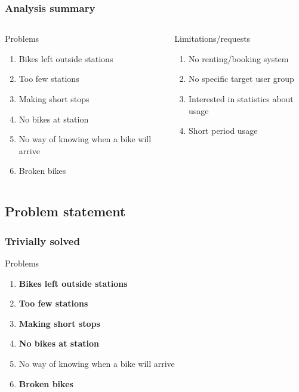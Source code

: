 \begin{frame}
\frametitle{Analysis summary}
\begin{columns}
\begin{column}{.45\textwidth}
\begin{block}{Problems\footnotemark}
\begin{enumerate}
\item Bikes left outside stations
\item Too few stations
\item Making short stops
\item No bikes at station
\item No way of knowing when a bike will arrive
\item Broken bikes
\end{enumerate}
\end{block}
\end{column}
\begin{column}{.45\textwidth}
\begin{block}{Limitations/requests\footnotemark[1]}
\begin{enumerate}
\item No renting/booking system
\item No specific target user group
\item Interested in statistics about usage
\item Short period usage
\end{enumerate}
\end{block}
\end{column}
\end{columns}
\end{frame}

\subsection{Problem statement}

\begin{frame}
\frametitle{Trivially solved}
\begin{block}{Problems}
\begin{enumerate}
\item \textbf{Bikes left outside stations}
\item \textbf{Too few stations}
\item \textbf{Making short stops}
\item \textbf{No bikes at station}
\item No way of knowing when a bike will arrive
\item \textbf{Broken bikes}
\end{enumerate}
\end{block}
\end{frame}

